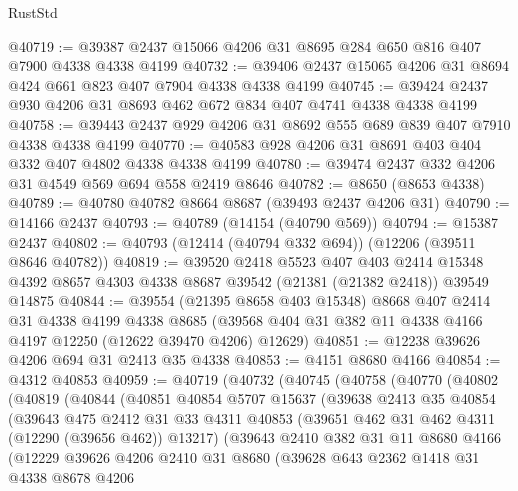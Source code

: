 \begin{lexlean}{RustStd}
\begin{coremodule}
{\begin{coremodule}
{{{{{{{{{{{{{{{{{{{{{{{{{{{{{{{{{{{{{{{{{{{{{{{{{{@40719 := @39387 @2437 @15066 @4206 @31 @8695 @284 @650 @816 @407 @7900 @4338 @4338 @4199
@40732 := @39406 @2437 @15065 @4206 @31 @8694 @424 @661 @823 @407 @7904 @4338 @4338 @4199
@40745 := @39424 @2437 @930 @4206 @31 @8693 @462 @672 @834 @407 @4741 @4338 @4338 @4199
@40758 := @39443 @2437 @929 @4206 @31 @8692 @555 @689 @839 @407 @7910 @4338 @4338 @4199
@40770 := @40583 @928 @4206 @31 @8691 @403 @404 @332 @407 @4802 @4338 @4338 @4199
@40780 := @39474 @2437 @332 @4206 @31 @4549 @569 @694 @558 @2419 @8646
@40782 := @8650 (@8653 @4338)
@40789 := @40780 @40782 @8664 @8687 (@39493 @2437 @4206 @31)
@40790 := @14166 @2437
@40793 := @40789 (@14154 (@40790 @569))
@40794 := @15387 @2437
@40802 := @40793 (@12414 (@40794 @332 @694)) (@12206 (@39511 @8646 @40782))
@40819 := @39520
    @2418
    @5523
    @407
    @403
    @2414
    @15348
    @4392
    @8657
    @4303
    @4338
    @8687
    @39542
    (@21381 (@21382 @2418))
    @39549
    @14875
@40844 := @39554
    (@21395 @8658 @403 @15348)
    @8668
    @407
    @2414
    @31
    @4338
    @4199
    @4338
    @8685
    (@39568 @404 @31 @382 @11 @4338 @4166 @4197 @12250 (@12622 @39470 @4206) @12629)
@40851 := @12238 @39626 @4206 @694 @31 @2413 @35 @4338
@40853 := @4151 @8680 @4166
@40854 := @4312 @40853
@40959 := @40719
    (@40732
      (@40745
        (@40758
          (@40770
            (@40802
              (@40819
                (@40844
                  (@40851
                    @40854
                    @5707
                    @15637
                    (@39638
                      @2413
                      @35
                      @40854
                      (@39643
                        @475
                        @2412
                        @31
                        @33
                        @4311
                        @40853
                        (@39651 @462 @31 @462 @4311 (@12290 (@39656 @462)) @13217)
                        (@39643
                          @2410
                          @382
                          @31
                          @11
                          @8680
                          @4166
                          (@12229
                            @39626
                            @4206
                            @2410
                            @31
                            @8680
                            (@39628
                              @643
                              @2362
                              @1418
                              @31
                              @4338
                              @8678
                              @4206
}}}}}}}}}}}}}}}}}}}}}}}}}}}}}}}}}}}}}}}}}}}}}}}}}}
\end{coremodule}}
\end{coremodule}
\end{lexlean}
